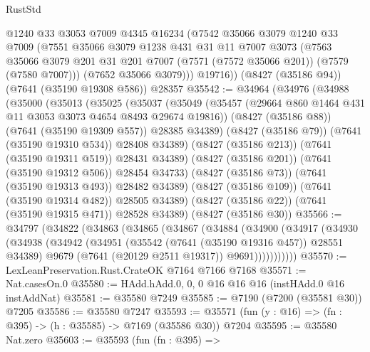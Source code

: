 \begin{lexlean}{RustStd}
\begin{coremodule}
{\begin{coremodule}
{{{{{{{{{{{{{{{{{{{{{{{{{{{{{{{{        @1240
        @33
        @3053
        @7009
        @4345
        @16234
        (@7542
          @35066
          @3079
          @1240
          @33
          @7009
          (@7551
            @35066
            @3079
            @1238
            @431
            @31
            @11
            @7007
            @3073
            (@7563
              @35066
              @3079
              @201
              @31
              @201
              @7007
              (@7571 (@7572 @35066 @201))
              (@7579 (@7580 @7007)))
            (@7652 @35066 @3079)))
        @19716))
    (@8427 (@35186 @94))
    (@7641 (@35190 @19308 @586))
    @28357
@35542 := @34964
    (@34976
      (@34988
        (@35000
          (@35013
            (@35025
              (@35037
                (@35049
                  (@35457 (@29664 @860 @1464 @431 @11 @3053 @3073 @4654 @8493 @29674 @19816))
                  (@8427 (@35186 @88))
                  (@7641 (@35190 @19309 @557))
                  @28385
                  @34389)
                (@8427 (@35186 @79))
                (@7641 (@35190 @19310 @534))
                @28408
                @34389)
              (@8427 (@35186 @213))
              (@7641 (@35190 @19311 @519))
              @28431
              @34389)
            (@8427 (@35186 @201))
            (@7641 (@35190 @19312 @506))
            @28454
            @34733)
          (@8427 (@35186 @73))
          (@7641 (@35190 @19313 @493))
          @28482
          @34389)
        (@8427 (@35186 @109))
        (@7641 (@35190 @19314 @482))
        @28505
        @34389)
      (@8427 (@35186 @22))
      (@7641 (@35190 @19315 @471))
      @28528
      @34389)
    (@8427 (@35186 @30))
@35566 := @34797
    (@34822
      (@34863
        (@34865
          (@34867
            (@34884
              (@34900
                (@34917
                  (@34930
                    (@34938
                      (@34942
                        (@34951
                          (@35542 (@7641 (@35190 @19316 @457)) @28551 @34389)
                          @9679
                          (@7641 (@20129 @2511 @19317))
                          @9691)))))))))))
@35570 := LexLeanPreservation.Rust.CrateOK @7164 @7166 @7168
@35571 := Nat.casesOn.{0}
@35580 := HAdd.hAdd.{0, 0, 0} @16 @16 @16 (instHAdd.{0} @16 instAddNat)
@35581 := @35580 @7249
@35585 := @7190 (@7200 (@35581 @30)) @7205
@35586 := @35580 @7247
@35593 := @35571 (fun (y : @16) => (fn : @395) -> (h : @35585) -> @7169 (@35586 @30)) @7204
@35595 := @35580 Nat.zero
@35603 := @35593
    (fun (fn : @395) =>
}}}}}}}}}}}}}}}}}}}}}}}}}}}}}}}}
\end{coremodule}}
\end{coremodule}
\end{lexlean}
